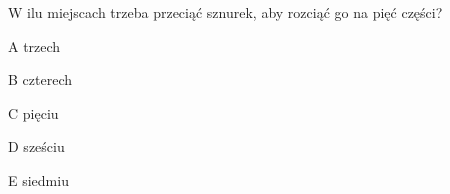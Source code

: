 \begin{tresc}
W ilu miejscach trzeba przeciąć sznurek, aby rozciąć go na pięć części?
\end{tresc}
\begin{wariant}{A} trzech \end{wariant}
\begin{wariant}{B} czterech \end{wariant}
\begin{wariant}{C} pięciu \end{wariant}
\begin{wariant}{D} sześciu \end{wariant}
\begin{wariant}{E} siedmiu \end{wariant}
